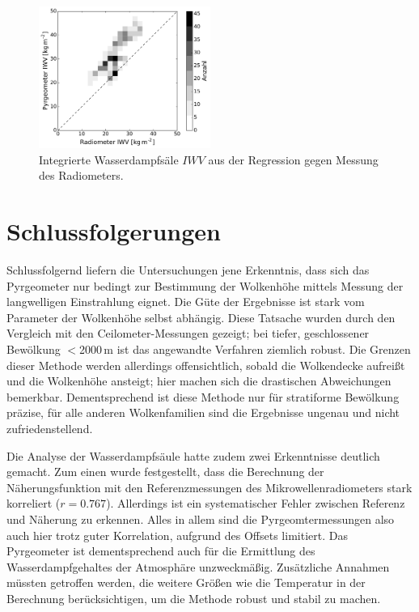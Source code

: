\documentclass[10pt,a4paper,compsoc,peer review papers]{IEEEtran}
\begin{document}
\begin{figure}[ht]
  \centering
  \includegraphics[width=0.5\textwidth]{figures/iwv_fit_correlation.pdf}
  \caption{Integrierte Wasserdampfsäle $IWV$ aus der Regression gegen Messung
  des Radiometers.}
  \label{fig:iwv_fit_correlation}
\end{figure}

\section{Schlussfolgerungen}\label{sec:schlussfolgerungen}
Schlussfolgernd liefern die Untersuchungen jene Erkenntnis, dass sich das 
Pyrgeometer nur bedingt zur Bestimmung der Wolkenhöhe mittels Messung der 
langwelligen Einstrahlung eignet. Die Güte der Ergebnisse ist stark vom 
Parameter der Wolkenhöhe selbst abhängig. Diese Tatsache wurden durch den 
Vergleich mit den Ceilometer-Messungen gezeigt; bei tiefer, geschlossener 
Bewölkung $<$2000\,m ist das angewandte Verfahren ziemlich robust. Die Grenzen 
dieser Methode werden allerdings offensichtlich, sobald die Wolkendecke aufreißt 
und die Wolkenhöhe ansteigt; hier machen sich die drastischen Abweichungen
bemerkbar. Dementsprechend ist diese Methode nur für  stratiforme Bewölkung
präzise, für alle anderen Wolkenfamilien sind die  Ergebnisse ungenau und
nicht zufriedenstellend.

Die Analyse der Wasserdampfsäule hatte zudem zwei Erkenntnisse deutlich gemacht. 
Zum einen wurde festgestellt, dass die Berechnung der Näherungsfunktion mit den 
Referenzmessungen des Mikrowellenradiometers stark korreliert ($r = 0.767$). 
Allerdings ist ein systematischer Fehler zwischen Referenz und Näherung zu
erkennen. Alles in allem  sind die Pyrgeomtermessungen also auch hier trotz
guter Korrelation, aufgrund  des Offsets limitiert. Das Pyrgeometer ist
dementsprechend auch für die  Ermittlung des Wasserdampfgehaltes der Atmosphäre
unzweckmäßig. Zusätzliche Annahmen müssten getroffen werden, die weitere Größen
wie die Temperatur in der Berechnung berücksichtigen, um die Methode robust und
stabil zu machen.
\end{document}

